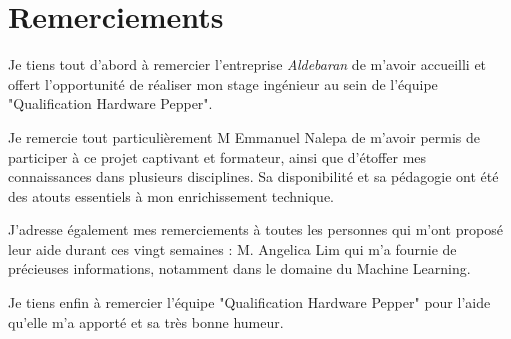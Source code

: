 \chapter*{Remerciements}
\thispagestyle{fancy}
\label{Remerciements}

Je tiens tout d'abord à remercier l'entreprise \emph{Aldebaran} de m'avoir accueilli et offert l'opportunité de réaliser mon stage ingénieur au sein de l'équipe "Qualification Hardware Pepper".

Je remercie tout particulièrement M Emmanuel Nalepa de m'avoir permis de participer à ce projet captivant et formateur, ainsi que d'étoffer mes connaissances dans plusieurs disciplines.  Sa disponibilité et sa pédagogie ont été des atouts essentiels à mon enrichissement technique.

J’adresse également mes remerciements à toutes les personnes qui m’ont proposé leur aide durant ces vingt semaines :
M. Angelica Lim qui m’a fournie de précieuses informations, notamment dans le domaine du Machine Learning.

Je tiens enfin à remercier l'équipe "Qualification Hardware Pepper" pour l'aide qu'elle m'a apporté et sa très bonne humeur.
